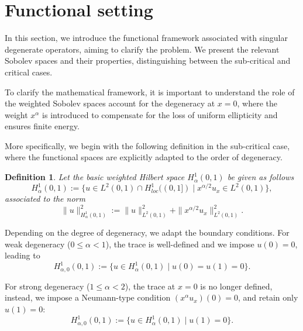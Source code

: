 \documentclass[sn-mathphys]{sn-jnl}
\newtheorem{definition}[theorem]{Definition}
\begin{document}
\section{Functional setting}\label{sec2}
 In this section, we introduce the functional framework associated with singular degenerate operators, aiming to clarify the problem. We present the relevant Sobolev spaces and their properties, distinguishing between the sub-critical and critical cases.

To clarify the mathematical framework, it is important to understand the role of the weighted Sobolev spaces account for the degeneracy at $x=0$, where the weight $x^\alpha$ is introduced to compensate for the loss of uniform ellipticity and ensures finite energy. 

More specifically, we begin with the following definition in the sub-critical case, where the functional spaces are explicitly adapted to the order of degeneracy.


\begin{definition}
Let the basic weighted Hilbert space $H_{\alpha}^{1}(0,1)$ be given as follows 
$$H_{\alpha}^{1}(0,1):=\{u\in L^{2}(0,1)\cap H_{loc}^{1}((0,1]) \mid x^{\alpha/2}u_{x}\in L^{2}(0,1)\},$$
associated to the norm
    \begin{equation*}
        \|u\|^{2}_{H^{1}_{\alpha}(0,1)}:= \|u\|^{2}_{L^{2}(0,1)} + \|x^{\alpha/2} u_x\|^{2}_{L^{2}(0,1)}.
    \end{equation*}
\end{definition}

 Depending on the degree of degeneracy, we adapt the boundary conditions. For weak degeneracy ($0 \le \alpha < 1$), the trace is well-defined and we impose $u(0)=0$, leading to
$$H_{\alpha,0}^{1}(0,1):=\{u\in H_{\alpha}^{1}(0,1) \mid u(0)=u(1)=0\}.$$

For strong degeneracy ($1 \le \alpha < 2$), the trace at \(x=0\) is no longer defined, instead, we impose a Neumann-type condition $(x^\alpha u_x)(0)=0$, and retain only $u(1)=0$:
$$H_{\alpha,0}^{1}(0,1):=\{u\in H_{\alpha}^{1}(0,1) \mid u(1)=0\}.$$
\end{document}

